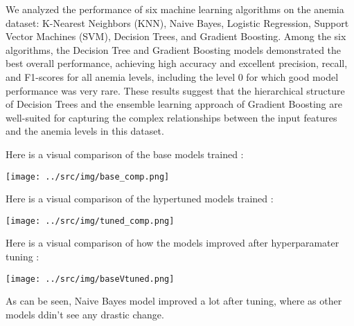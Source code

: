 We analyzed the performance of six machine learning algorithms on the anemia dataset: K-Nearest Neighbors (KNN), Naive Bayes, Logistic Regression, Support Vector Machines (SVM), Decision Trees, and Gradient Boosting. Among the six algorithms, the Decision Tree and Gradient Boosting models demonstrated the best overall performance, achieving high accuracy and excellent precision, recall, and F1-scores for all anemia levels, including the level 0 for which good model performance was very rare. These results suggest that the hierarchical structure of Decision Trees and the ensemble learning approach of Gradient Boosting are well-suited for capturing the complex relationships between the input features and the anemia levels in this dataset.


Here is a visual comparison of the base models trained :

\texttt{[image: ../src/img/base\_comp.png]}




Here is a visual comparison of the hypertuned models trained :

\texttt{[image: ../src/img/tuned\_comp.png]}


Here is a visual comparison of how the models improved after hyperparamater tuning :


\texttt{[image: ../src/img/baseVtuned.png]}

As can be seen, Naive Bayes model improved a lot after tuning, where as other models ddin't see any drastic change.